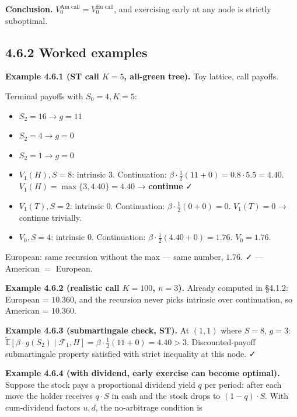 \documentclass[
  10pt,
  twoside]{book}
\begin{document}
\textbf{Conclusion.} \(V_0^{\text{Am call}} = V_0^{\text{Eu call}}\),
and exercising early at any node is strictly suboptimal.

\subsection{4.6.2 Worked examples}\label{worked-examples-2}

\textbf{Example 4.6.1 (ST call \(K=5\), all-green tree).} Toy lattice,
call payoffs.

Terminal payoffs with \(S_0 = 4, K = 5\):

\begin{itemize}
\item
  \(S_2 = 16 \to g = 11\)
\item
  \(S_2 = 4 \to g = 0\)
\item
  \(S_2 = 1 \to g = 0\)
\item
  \(V_1(H), S = 8\): intrinsic \(3\). Continuation:
  \(\beta\cdot \tfrac{1}{2}(11 + 0) = 0.8\cdot 5.5 = 4.40\).
  \(V_1(H) = \max\{3, 4.40\} = 4.40\) → \textbf{continue} ✓
\item
  \(V_1(T), S = 2\): intrinsic \(0\). Continuation:
  \(\beta\cdot\tfrac{1}{2}(0 + 0) = 0\). \(V_1(T) = 0\) → continue
  trivially.
\item
  \(V_0, S = 4\): intrinsic \(0\). Continuation:
  \(\beta\cdot\tfrac{1}{2}(4.40 + 0) = 1.76\). \(V_0 = 1.76\).
\end{itemize}

European: same recursion without the max --- same number, \(1.76\). ✓
--- American \(=\) European.

\textbf{Example 4.6.2 (realistic call \(K=100\), \(n=3\)).} Already
computed in §4.1.2: European = \(10.360\), and the recursion never picks
intrinsic over continuation, so American = \(10.360\).

\textbf{Example 4.6.3 (submartingale check, ST).} At \((1, 1)\) where
\(S = 8\), \(g = 3\):
\(\tilde{\mathbb{E}}[\beta\cdot g(S_2)\mid\mathcal F_1, H] = \beta\cdot\tfrac{1}{2}(11 + 0) = 4.40 > 3\).
Discounted-payoff submartingale property satisfied with strict
inequality at this node. ✓

\textbf{Example 4.6.4 (with dividend, early exercise can become
optimal).} Suppose the stock pays a proportional dividend yield \(q\)
per period: after each move the holder receives \(q\cdot S\) in cash and
the stock drops to \((1-q)\cdot S\). With cum-dividend factors \(u, d\),
the no-arbitrage condition is
\end{document}
